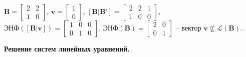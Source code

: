 $ \mathbf{B} = \left[\begin{array}{cccc}
2 & 2 \\
1 & 0
\end{array}\right] $, 
$ \mathbf{v} = \left[\begin{array}{cccc}
1 \\
0
\end{array}\right] $, 
$ \left[\mathbf{B} | \mathbf{B}'\right] = \left[\begin{array}{cccc}
2 & 2 & 1 \\
1 & 0 & 0
\end{array}\right] $, 
$ \text{ЭНФ}(\left[\mathbf{B} | \mathbf{v} \right]) = \left[\begin{array}{cccc}
1 & 0 & 0 \\
0 & 1 & 0
\end{array}\right] $,
$ \text{ЭНФ}(\mathbf{B}) = \left[\begin{array}{cccc}
2 & 0 \\
0 & 1
\end{array}\right] $ -- вектор $ \mathbf{v} \not \subseteq \mathcal{L}(\mathbf{B}) $.

\textbf{Решение систем линейных уравнений.} 


\clearpage